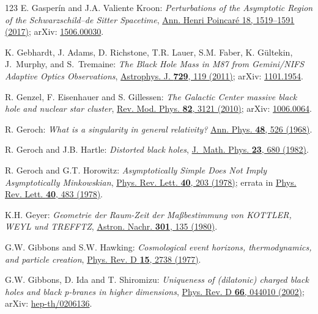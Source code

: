 \begin{thebibliography}{123}
E. Gasperín and  J.A. Valiente Kroon:
{\em Perturbations of the Asymptotic Region of the Schwarzschild–de Sitter Spacetime},
\href{https://doi.org/10.1007/s00023-016-0544-z}{Ann. Henri Poincaré 18, 1519–1591 (2017)};
arXiv: \href{https://arxiv.org/abs/1506.00030}{1506.00030}.

K. Gebhardt, J. Adams, D. Richstone, T.R. Lauer, S.M. Faber, K. Gültekin, J.~Murphy, and S.~Tremaine:
{\em The Black Hole Mass in M87 from Gemini/NIFS Adaptive Optics Observations},
\href{https://doi.org/10.1088/0004-637X/729/2/119}{Astrophys. J. {\bf 729}, 119 (2011)};
arXiv: \href{https://arxiv.org/abs/1101.1954}{1101.1954}.

R. Genzel, F. Eisenhauer and S. Gillessen:
{\em The Galactic Center massive black hole and nuclear star cluster},
\href{https://doi.org/10.1103/RevModPhys.82.3121}{Rev. Mod. Phys. {\bf 82}, 3121 (2010)};
arXiv: \href{https://arxiv.org/abs/1006.0064}{1006.0064}.

R. Geroch:
{\em What is a singularity in general relativity?}
\href{https://doi.org/10.1016/0003-4916(68)90144-9}{Ann. Phys. {\bf 48}, 526 (1968)}.

R. Geroch and J.B. Hartle:
{\em Distorted black holes},
\href{https://doi.org/10.1063/1.525384}{J.~Math. Phys. {\bf 23}, 680 (1982)}.

R. Geroch and G.T. Horowitz:
{\em Asymptotically Simple Does Not Imply Asymptotically Minkowskian},
\href{https://doi.org/10.1103/PhysRevLett.40.203}{Phys. Rev. Lett. {\bf 40}, 203 (1978)};
errata in \href{https://doi.org/10.1103/PhysRevLett.40.483.3}{Phys. Rev. Lett. {\bf 40}, 483 (1978)}.

K.H. Geyer:
{\em Geometrie der Raum-Zeit der Maßbestimmung von KOTTLER, WEYL und TREFFTZ},
\href{https://doi.org/10.1002/asna.2103010304}{Astron. Nachr. {\bf 301}, 135 (1980)}.

G.W. Gibbons and S.W. Hawking:
{\em Cosmological event horizons, thermodynamics, and particle creation},
\href{https://doi.org/10.1103/PhysRevD.15.2738}{Phys. Rev. D {\bf 15}, 2738 (1977)}.

G.W. Gibbons, D. Ida and T. Shiromizu:
{\em Uniqueness of (dilatonic) charged black holes and black p-branes in higher dimensions},
\href{https://doi.org/10.1103/PhysRevD.66.044010}{Phys. Rev. D {\bf 66}, 044010 (2002)};
arXiv: \href{https://arxiv.org/abs/hep-th/0206136}{hep-th/0206136}.


\end{thebibliography}
